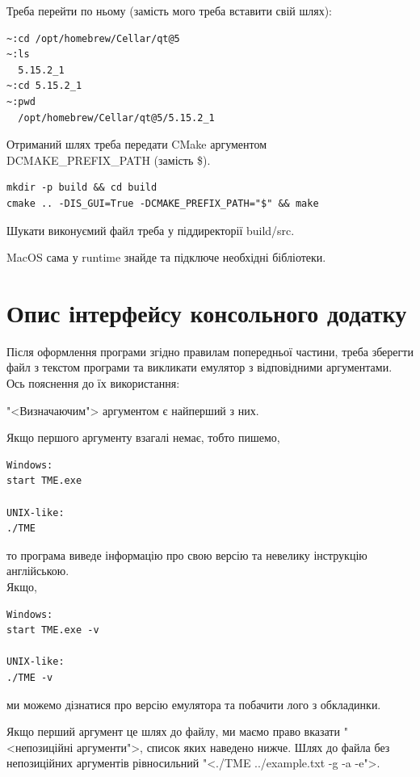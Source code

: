 \documentclass[oneside,final,14pt]{extreport}
\begin{document}
Треба перейти по ньому (замість мого треба вставити свій шлях):

\begin{tcolorbox}
\begin{verbatim}
~:cd /opt/homebrew/Cellar/qt@5
~:ls
  5.15.2_1
~:cd 5.15.2_1
~:pwd
  /opt/homebrew/Cellar/qt@5/5.15.2_1
\end{verbatim}
\end{tcolorbox}

Отриманий шлях треба передати CMake аргументом DCMAKE\_PREFIX\_PATH (замість \$).

\begin{tcolorbox}
\begin{verbatim}
mkdir -p build && cd build
cmake .. -DIS_GUI=True -DCMAKE_PREFIX_PATH="$" && make
\end{verbatim}
\end{tcolorbox}

Шукати виконуємий файл треба у піддиректорії build/src.

MacOS сама у runtime знайде та підключе необхідні бібліотеки.

\section{Опис інтерфейсу консольного додатку}
Після оформлення програми згідно правилам попередньої частини, треба зберегти файл з текстом програми та викликати емулятор з відповідними аргументами. Ось пояснення до їх використання:
\bigskip
		
"<Визначаючим"> аргументом є найперший з них.
		
Якщо першого аргументу взагалі немає, тобто пишемо,
\begin{tcolorbox}
\begin{verbatim}
Windows:
start TME.exe

UNIX-like:
./TME
\end{verbatim}
\end{tcolorbox}
то програма виведе інформацію про свою версію та невелику інструкцію англійською.
\\	
Якщо,
\begin{tcolorbox}
\begin{verbatim}
Windows:
start TME.exe -v

UNIX-like:
./TME -v
\end{verbatim}
\end{tcolorbox}
ми можемо дізнатися про версію емулятора та побачити лого з обкладинки.

Якщо перший аргумент це шлях до файлу, ми маємо право вказати "<непозиційні аргументи">, список яких наведено нижче. Шлях до файла без непозиційних аргументів рівносильний "<./TME ../example.txt -g -a -e">.
		
\end{document}

